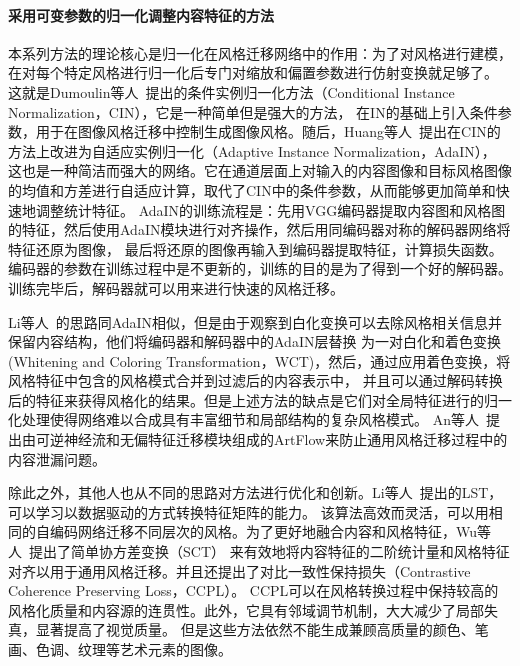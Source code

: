 \paragraph{采用可变参数的归一化调整内容特征的方法}
本系列方法的理论核心是归一化在风格迁移网络中的作用：为了对风格进行建模，在对每个特定风格进行归一化后专门对缩放和偏置参数进行仿射变换就足够了。
这就是Dumoulin等人~\cite{dumoulin2016learned,ghiasi2017exploring}提出的条件实例归一化方法（Conditional Instance Normalization，CIN），它是一种简单但是强大的方法，
在IN的基础上引入条件参数，用于在图像风格迁移中控制生成图像风格。随后，Huang等人~\cite{huang2017arbitrary}提出在CIN的方法上改进为自适应实例归一化（Adaptive Instance Normalization，AdaIN），
这也是一种简洁而强大的网络。它在通道层面上对输入的内容图像和目标风格图像的均值和方差进行自适应计算，取代了CIN中的条件参数，从而能够更加简单和快速地调整统计特征。
AdaIN的训练流程是：先用VGG编码器提取内容图和风格图的特征，然后使用AdaIN模块进行对齐操作，然后用同编码器对称的解码器网络将特征还原为图像，
最后将还原的图像再输入到编码器提取特征，计算损失函数。编码器的参数在训练过程中是不更新的，训练的目的是为了得到一个好的解码器。训练完毕后，解码器就可以用来进行快速的风格迁移。
\par Li等人~\cite{li2017universal}的思路同AdaIN相似，但是由于观察到白化变换可以去除风格相关信息并保留内容结构，他们将编码器和解码器中的AdaIN层替换
为一对白化和着色变换(Whitening and Coloring Transformation，WCT)，然后，通过应用着色变换，将风格特征中包含的风格模式合并到过滤后的内容表示中，
并且可以通过解码转换后的特征来获得风格化的结果。但是上述方法的缺点是它们对全局特征进行的归一化处理使得网络难以合成具有丰富细节和局部结构的复杂风格模式。
An等人~\cite{an2021artflow}提出由可逆神经流和无偏特征迁移模块组成的ArtFlow来防止通用风格迁移过程中的内容泄漏问题。
\par 除此之外，其他人也从不同的思路对方法进行优化和创新。Li等人~\cite{li2019learning}提出的LST，可以学习以数据驱动的方式转换特征矩阵的能力。
该算法高效而灵活，可以用相同的自编码网络迁移不同层次的风格。为了更好地融合内容和风格特征，Wu等人~\cite{wu2022ccpl}提出了简单协方差变换（SCT）
来有效地将内容特征的二阶统计量和风格特征对齐以用于通用风格迁移。并且还提出了对比一致性保持损失（Contrastive Coherence Preserving Loss，CCPL）。
CCPL可以在风格转换过程中保持较高的风格化质量和内容源的连贯性。此外，它具有邻域调节机制，大大减少了局部失真，显著提高了视觉质量。
但是这些方法依然不能生成兼顾高质量的颜色、笔画、色调、纹理等艺术元素的图像。

